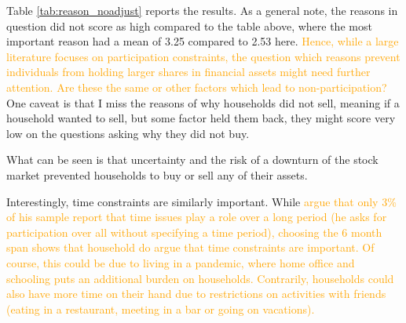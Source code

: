 \documentclass[ProjectABM]{subfiles}
\begin{document}
Table \ref{tab:reason_noadjust} reports the results. As a general note, the reasons in question did not score as high compared to the table above, where the most important reason had a mean of 3.25 compared to 2.53 here. \textcolor{orange}{Hence, while a large literature focuses on participation constraints, the question which reasons prevent individuals from holding larger shares in financial assets might need further attention. Are these the same or other factors which lead to non-participation?} One caveat is that I miss the reasons of why households did not sell, meaning if a household wanted to sell, but some factor held them back, they might score very low on the questions asking why they did not buy.

What can be seen is that uncertainty and the risk of a downturn of the stock market prevented households to buy or sell any of their assets. %

Interestingly, time constraints are similarly important. While \textcolor{orange}{\cite{choi_2020} argue that only 3\% of his sample report that time issues play a role over a long period (he asks for participation over all without specifying a time period), choosing the 6 month span shows that household do argue that time constraints are important. Of course, this could be due to living in a pandemic, where home office and schooling puts an additional burden on households. Contrarily, households could also have more time on their hand due to restrictions on activities with friends (eating in a restaurant, meeting in a bar or going on vacations).}


\end{document}

